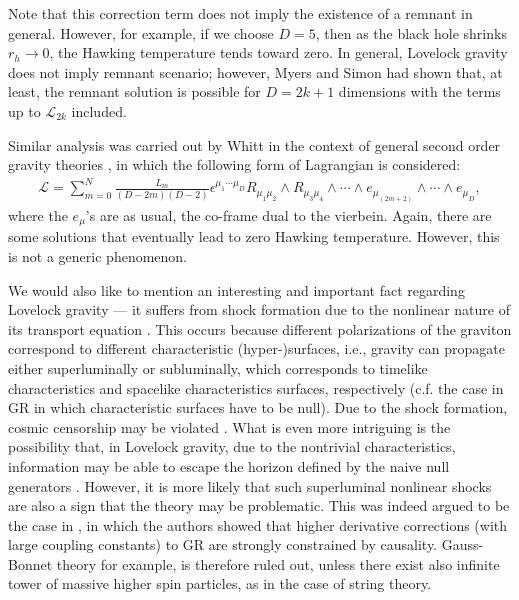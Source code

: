 \documentclass[12pt]{article}
\newcommand{\2}{$^2$}
\newcommand{\3}{$^3$}
\newcommand{\4}{$_4$}
\newcommand{\5}{$_5$}
\begin{document}
Note that this correction term does not imply the existence of a remnant in general. However, for example, if we choose $D=5$, then as the black hole shrinks $r_{h} \rightarrow 0$, the Hawking temperature tends toward zero.  In general, Lovelock gravity does not imply remnant scenario; however, Myers and Simon \cite{Myers:1988ze} had shown that, at least, the remnant solution is possible for $D = 2k + 1$ dimensions with the terms up to $\mathcal{L}_{2k}$ included.

Similar analysis was carried out by Whitt \cite{Whitt:1988ax} in the context of general second order gravity theories \cite{Wheeler:1985qd}, in which the following form of Lagrangian is considered:  
\begin{eqnarray}
\mathcal{L} = \sum_{m=0}^{N} \frac{L_{m}}{(D-2m)(D-2)\!} \epsilon^{\mu_{1} \cdots \mu_{D}} R_{\mu_{1}\mu_{2}} \wedge R_{\mu_{3}\mu_{4}} \wedge \cdots \wedge e_{\mu_{(2m+2)}} \wedge \cdots \wedge e_{\mu_{D}},
\end{eqnarray}
where the $e_{\mu}$'s are as usual, the co-frame dual to the vierbein. Again, there are some solutions that eventually lead to zero Hawking temperature. However, this is not a generic phenomenon.

We would also like to mention an interesting and important fact regarding Lovelock gravity --- it suffers from shock formation due to the nonlinear nature of its transport equation \cite{RTW1, RTW2}. This occurs because different polarizations of the graviton correspond to different characteristic (hyper-)surfaces, i.e., gravity can propagate either superluminally or subluminally, which corresponds to timelike characteristics and spacelike characteristics surfaces, respectively (c.f. the case in GR in which characteristic surfaces have to be null). Due to the shock formation, cosmic censorship may be violated \cite{RTW1}. What is even more intriguing is the possibility that, in Lovelock gravity, due to the nontrivial characteristics, information may be able to escape the horizon defined by the naive null generators \cite{izumi}. However, it is more likely that such superluminal nonlinear shocks are also a sign that the theory may be problematic. This was indeed argued to be the case in \cite{camanho}, in which the authors showed that higher derivative corrections (with large coupling constants) to GR are strongly constrained by causality.  Gauss-Bonnet theory for example, is therefore ruled out, unless there exist also infinite tower of massive higher spin particles, as in the case of string theory.
\end{document}
